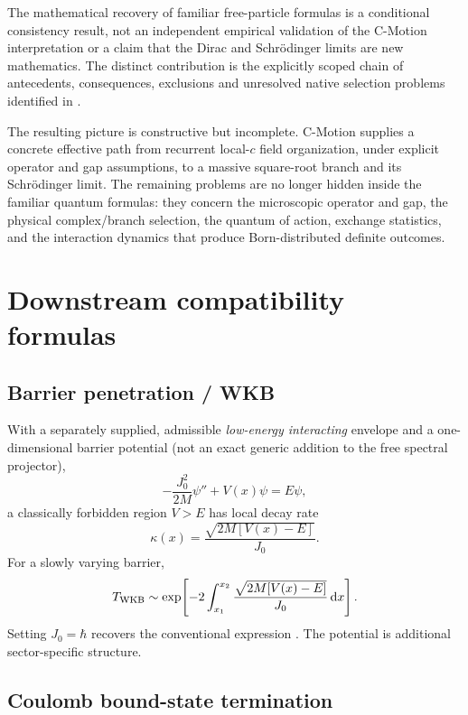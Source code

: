 \documentclass[11pt]{article}
\theoremstyle{definition}
\newcommand{\dd}{\mathrm{d}}
\begin{document}
The mathematical recovery of familiar free-particle formulas is a
conditional consistency result, not an independent empirical validation of the
C-Motion interpretation or a claim that the Dirac and Schr\"odinger limits
are new mathematics.  The distinct contribution is the explicitly scoped
chain of antecedents, consequences, exclusions and unresolved native
selection problems identified in .

The resulting picture is constructive but incomplete.  C-Motion supplies a concrete effective
path from recurrent local-$c$ field organization, under explicit operator and gap assumptions,
to a massive square-root branch and its Schrödinger limit.  The remaining problems are no
longer hidden inside the familiar quantum formulas: they concern the microscopic operator and
gap, the physical complex/branch selection, the quantum of action, exchange statistics, and
the interaction dynamics that produce Born-distributed definite outcomes.


\medskip

\appendix
\section{Downstream compatibility formulas}
\label{app:compatibility}

\subsection{Barrier penetration / WKB}

With a separately supplied, admissible \emph{low-energy interacting} envelope
and a one-dimensional barrier potential (not an exact generic addition to the
free spectral projector),
\begin{equation}
 -\frac{J_0^2}{2M}\psi''+V(x)\psi=E\psi,
\end{equation}
a classically forbidden region $V>E$ has local decay rate
\begin{equation}
 \kappa(x)=\frac{\sqrt{2M[V(x)-E]}}{J_0}.
\end{equation}
For a slowly varying barrier,
\begin{equation}
 T_{\rm WKB}\sim
 \exp\!\left[-2\int_{x_1}^{x_2}
 \frac{\sqrt{2M[V(x)-E]}}{J_0}\,\dd x\right].
\end{equation}
Setting $J_0=\hbar$ recovers the conventional expression
\cite{Wentzel1926WKB}.  The potential is additional sector-specific structure.

\subsection{Coulomb bound-state termination}
\end{document}
